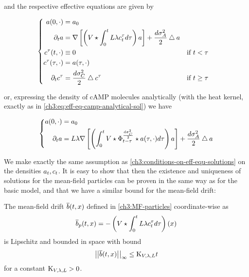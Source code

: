 and the respective effective equations are given by

\begin{equation}\label{ch7:EFFECTIVE-EQUATIONS}
	\left\{
	\begin{aligned}
		a(0, \cdot) &= a_0
		\\
		\partial_t a &= \nabla \left[ \left( V
		\star \int_0^t L\lambda c_t^\tau 	d \tau
		\right)
		a
		\right]
		+ \frac{d\sigma_A^2}{2} \bigtriangleup a	
		\\
		c^\tau(t, \cdot) 
		& \equiv 0
		&&\text{if } t < \tau
		\\
		c^\tau(\tau, \cdot) 
		&= a(\tau, \cdot)
		&&
		\\
		\partial_t c^\tau
		&= \frac{d\sigma_C^2}{2} \bigtriangleup c^\tau
		&&\text{if } t \geq \tau
	\end{aligned}
	\right.
\end{equation}

or, expressing the density of cAMP molecules analytically (with the heat kernel, exactly as in \ref{ch3:eq:eff-eq-camp-analytical-sol}) we have

\begin{equation}\label{ch7:PIDE}
	\left\{
	\begin{aligned}
		a(0, \cdot) &= a_0
		\\
		\partial_t a &=  L\lambda \nabla \left[ \left( \int_0^t
		V \star \Phi_{t-\tau}^{\frac{d\sigma_C^2}{2}} \star a(\tau, \cdot) 
		d \tau
		\right)
		a
		\right]
		+ \frac{d\sigma_A^2}{2} \bigtriangleup a
	\end{aligned}
	\right.
\end{equation}

We make exactly the same assumption as \ref{ch3:conditions-on-eff-equ-solutions} on the densities $a_t, c_t$.
It is easy to show that then the existence and uniqueness of solutions for the mean-field particles can be proven in the same way as for the basic model, and that we have a similar bound for the mean-field drift:

\begin{lemma}\label{ch7:mfdrift-lip-and-bound}
	The mean-field drift $\overline{b}(t,x)$ defined in \ref{ch3:MF-particles} coordinate-wise as
	\begin{equation*}
		\overline{b}_p(t,x) = 
		- \left( 
		V \star \int_0^t L \lambda c_t^\tau 	d \tau
		\right) (x)
	\end{equation*}
	is Lipschitz and bounded in space with bound
	\begin{equation*}
		\left|\left| \overline{b}(t,x) \right|\right|_\infty \leq 
		\text{K}_{V, \lambda,L} t
	\end{equation*}
	for a constant $\text{K}_{V, \lambda,L} > 0$.
\end{lemma}

